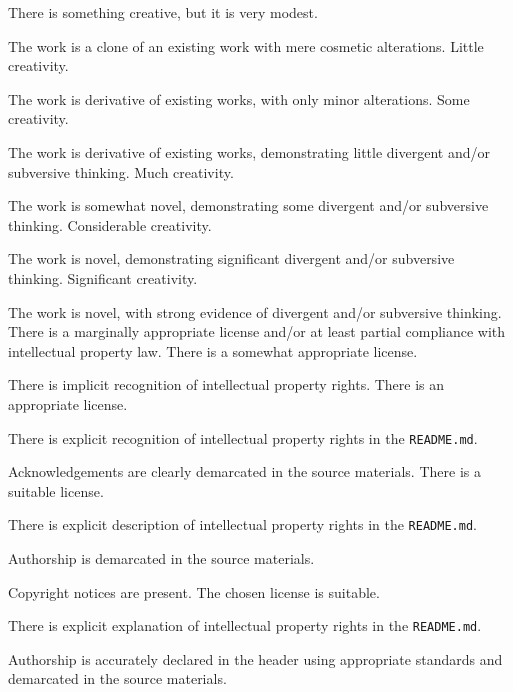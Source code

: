 \documentclass{../../fal_assignment}
\begin{document}
\begin{markingrubric}
%
        \grade\fail There is something creative, but it is very modest.
            \par The work is a clone of an existing work with mere cosmetic alterations.
        \grade Little creativity.
            \par The work is derivative of existing works, with only minor alterations.
        \grade Some creativity.
            \par The work is derivative of existing works, demonstrating little divergent and/or subversive thinking.
        \grade Much creativity.
            \par The work is somewhat novel, demonstrating some divergent and/or subversive thinking.
        \grade Considerable creativity.
            \par The work is novel, demonstrating significant divergent and/or subversive thinking.
        \grade Significant creativity.
            \par The work is novel, with strong evidence of divergent and/or subversive thinking.
%
        \grade\fail There is a marginally appropriate license and/or at least partial compliance with intellectual property law.
        \grade There is a somewhat appropriate license.
            \par There is implicit recognition of intellectual property rights.
        \grade There is an appropriate license. 
            \par There is explicit recognition of intellectual property rights in the \texttt{README.md}.
            \par Acknowledgements are clearly demarcated in the source materials.
        \grade There is a suitable license.
            \par There is explicit description of intellectual property rights in the \texttt{README.md}.
            \par Authorship is demarcated in the source materials.
            \par Copyright notices are present.
        \grade The chosen license is suitable. 
            \par There is explicit explanation of intellectual property rights in the \texttt{README.md}.
            \par Authorship is accurately declared in the header using appropriate standards and demarcated in the source materials.

\end{markingrubric}
\end{document}
